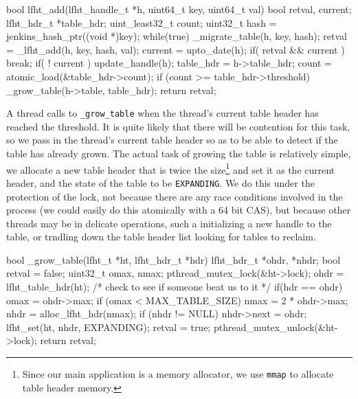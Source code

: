 \begin{center}
\begin{clisting}
bool lfht_add(lfht_handle_t *h, uint64_t key, uint64_t val){
  bool retval, current;
  lfht_hdr_t *table_hdr;
  uint_least32_t count;
  uint32_t hash = jenkins_hash_ptr((void *)key);
  while(true){
    _migrate_table(h, key, hash);
    retval = _lfht_add(h, key, hash, val);
    current = upto_date(h);
    if( retval && current ){ break; }
    if( ! current ){ update_handle(h); }
  }
  table_hdr = h->table_hdr;
  count = atomic_load(&table_hdr->count);
  if (count >= table_hdr->threshold){
    _grow_table(h->table, table_hdr);
  }
  return retval;
}

\end{clisting}
\end{center}


A thread calls to \texttt{\_grow\_table} when the thread's current table header has reached
the threshold. It is quite likely that there will be contention for this task, so 
we pass in the thread's current table header so as to be able to detect if the table
has already grown. The actual task of growing the table is relatively simple, we allocate
a new table header that is twice the size\footnote{Since our main application is a memory
allocator, we use \texttt{mmap} to allocate table header memory.}
and set it as the current header, and the state of the table to be \texttt{EXPANDING}.
We do this under the protection of the lock, not because there are any race conditions
involved in the process (we could easily do this atomically with a 64 bit CAS), but because
other threads may be in delicate operations, such a initializing a new handle to the table,
or trndling down the table header list looking for tables to reclaim.


\begin{center}
\begin{clisting}
bool _grow_table(lfht_t *ht,  lfht_hdr_t *hdr){
  lfht_hdr_t *ohdr, *nhdr;
  bool retval = false;
  uint32_t omax, nmax;
  pthread_mutex_lock(&ht->lock);
  ohdr = lfht_table_hdr(ht);
  /* check to see if someone beat us to it */
  if(hdr == ohdr){
    omax = ohdr->max;
    if (omax < MAX_TABLE_SIZE) {
      nmax = 2 * ohdr->max;
      nhdr  = alloc_lfht_hdr(nmax);
      if (nhdr != NULL){
	nhdr->next = ohdr;
	lfht_set(ht, nhdr, EXPANDING);
	retval = true;
      }
    }
  }
  pthread_mutex_unlock(&ht->lock);
  return retval;
}

\end{clisting}
\end{center}

